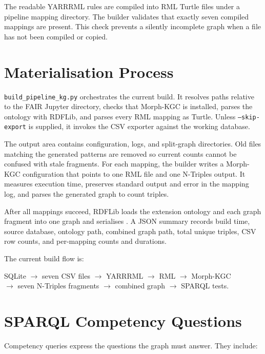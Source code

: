 The readable YARRRML rules are compiled into RML Turtle files under a pipeline mapping directory. The builder validates that exactly seven compiled mappings are present. This check prevents a silently incomplete graph when a file has not been compiled or copied.

\section{Materialisation Process}

\texttt{build\_pipeline\_kg.py} orchestrates the current build. It resolves paths relative to the FAIR Jupyter directory, checks that Morph-KGC is installed, parses the ontology with RDFLib, and parses every RML mapping as Turtle. Unless \texttt{--skip-export} is supplied, it invokes the CSV exporter against the working database.

The output area contains configuration, logs, and split-graph directories. Old files matching the generated patterns are removed so current counts cannot be confused with stale fragments. For each mapping, the builder writes a Morph-KGC configuration that points to one RML file and one N-Triples output. It measures execution time, preserves standard output and error in the mapping log, and parses the generated graph to count triples.

After all mappings succeed, RDFLib loads the extension ontology and each graph fragment into one graph and serialises . A JSON summary records build time, source database, ontology path, combined graph path, total unique triples, CSV row counts, and per-mapping counts and durations.

The current build flow is:

\begin{center}
SQLite $\rightarrow$ seven CSV files $\rightarrow$ YARRRML $\rightarrow$ RML $\rightarrow$ Morph-KGC\\
$\rightarrow$ seven N-Triples fragments $\rightarrow$ combined graph $\rightarrow$ SPARQL tests.
\end{center}

\section{SPARQL Competency Questions}

Competency queries express the questions the graph must answer. They include:

